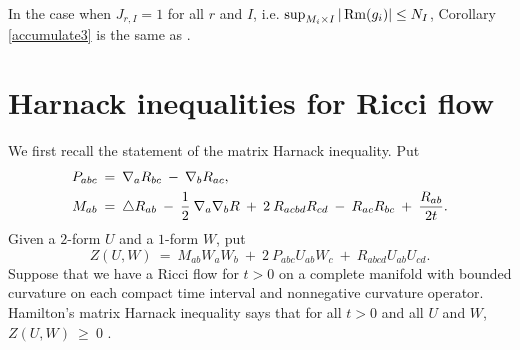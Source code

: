 In the case when $J_{r,I} = 1$ for all $r$ and $I$,
i.e. $\sup_{M_i \times I} |\operatorname{Rm}(g_i)| \le N_{I}$,
Corollary \ref{accumulate3} is the same as
\cite[Main Theorem]{Hamiltonnn}.

\section{Harnack inequalities for Ricci flow} \label{appharnack}

We first recall the statement of the matrix Harnack inequality.
Put
\begin{align}
P_{abc} \: & = \: \nabla_a R_{bc} \: - \: \nabla_b R_{ac}, \\
M_{ab} \: & = \: \triangle R_{ab} \: - \: \frac12 \: \nabla_a \nabla_b
R \: + \: 2 \: R_{acbd} R_{cd} \: - \: R_{ac} R_{bc} \: + \:
\frac{R_{ab}}{2t}. \notag
\end{align}
Given a $2$-form $U$ and a $1$-form $W$, put
\begin{equation}
Z(U, W) \: = \: M_{ab} W_a W_b \: + \: 2 \: P_{abc} U_{ab} W_c
\: + \: R_{abcd} U_{ab} U_{cd}.
\end{equation}
Suppose that we have a Ricci flow for $t > 0$
on a complete manifold with bounded
curvature on each
compact time interval
and nonnegative curvature operator.
Hamilton's matrix Harnack inequality says that for all $t > 0$ and all
$U$ and $W$, $Z(U, W) \: \ge \: 0$ \cite[Theorem 14.1]{Hamilton}.

